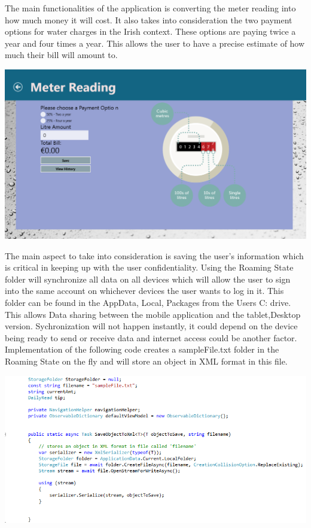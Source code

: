 \documentclass[runningheads,a4paper]{llncs}
\begin{document}
\begin{inparaenum}[]
The main functionalities of the application is converting the meter reading into how much money it will cost. It also takes into consideration the two payment options for water charges in the Irish context. These options are paying twice a year and four times a year. This allows the user to have a precise estimate of how much their bill will amount to.
\end{inparaenum}

\includegraphics[scale=0.2]{ScreenShotMeterReading}

\begin{inparaenum}[]
 The main aspect to take into consideration is saving the user's information which is critical in keeping up with the user confidentiality. Using the Roaming State folder will synchronize all data on all devices which will allow the user to sign into the same account on whichever devices the user wants to log in it. This folder can be found in the AppData, Local, Packages from the Users C: drive. This allows Data sharing between the mobile application and the tablet,Desktop version. Sychronization will not happen instantly, it could depend on the device being ready to send or receive data and internet access could be another factor. Implementation of the following code creates a sampleFile.txt folder in the Roaming State on the fly and will store an object in XML format in this file.  
\end{inparaenum}

\includegraphics[scale=0.7]{RoamingCode}
\end{document}
